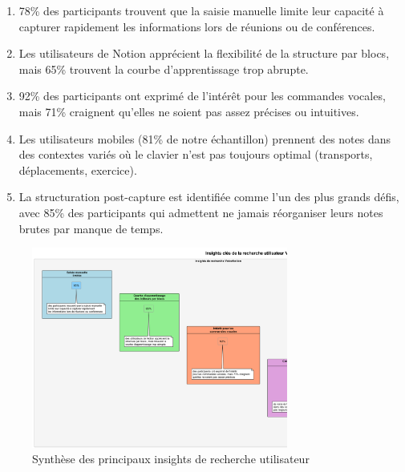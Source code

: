     \begin{enumerate}
        \item 78\% des participants trouvent que la saisie manuelle limite leur capacité à capturer rapidement les informations lors de réunions ou de conférences.
        
        \item Les utilisateurs de Notion apprécient la flexibilité de la structure par blocs, mais 65\% trouvent la courbe d'apprentissage trop abrupte.
        
        \item 92\% des participants ont exprimé de l'intérêt pour les commandes vocales, mais 71\% craignent qu'elles ne soient pas assez précises ou intuitives.
        
        \item Les utilisateurs mobiles (81\% de notre échantillon) prennent des notes dans des contextes variés où le clavier n'est pas toujours optimal (transports, déplacements, exercice).
        
        \item La structuration post-capture est identifiée comme l'un des plus grands défis, avec 85\% des participants qui admettent ne jamais réorganiser leurs notes brutes par manque de temps.
    \end{enumerate}
    
        \begin{figure}[htbp]
        \centering
        \includegraphics[width=0.75\textwidth]{assets/docs/user_research_insights.png}
        \caption{Synthèse des principaux insights de recherche utilisateur}
        \label{fig:user_research_insights}
    \end{figure}
    

